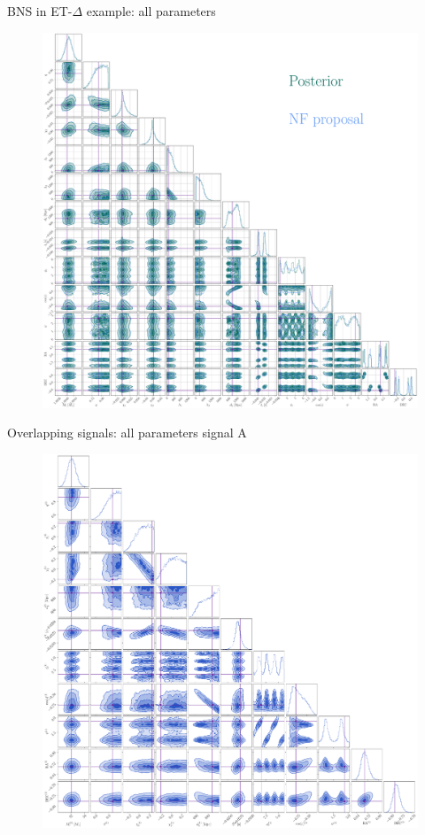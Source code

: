 \documentclass[usenames,dvipsnames,t]{beamer}
\begin{document}
\begin{frame}{BNS in ET-$\Delta$ example: all parameters}
  \begin{figure}
    \centering
    \includegraphics[scale=0.1075]{Figures/corner_plot_big.pdf}
  \end{figure}
\end{frame}

\begin{frame}{Overlapping signals: all parameters signal A}
  \begin{figure}
    \centering
    \includegraphics[scale=0.1075]{Figures/OS_injection_139_v2_1_cornerplot_all.pdf}
  \end{figure}
\end{frame}
\end{document}

